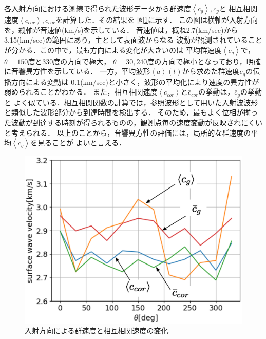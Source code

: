 各入射方向における測線で得られた波形データから群速度$\left<c_g\right>,\bar c_g$と
相互相関速度$\left<c_{cor}\right>, \bar c_{cor}$を計算した．その結果を
図\ref{fig:fig12}に示す．
この図は横軸が入射方向を，縦軸が音速値(km/s)を示している．
音速値は，概ね2.7(km/sec)から3.15(km/sec)の範囲にあり，主として表面波からなる
波動が観測されていることが分かる．この中で，最も方向による変化が大きいのは
平均群速度$\left<c_g\right>$で，$\theta=150$度と330度の方向で極大，
$\theta=30,240$度の方向で極小となっており，明確に音響異方性を示している．
一方，平均波形$\left<a \right>(t)$から求めた群速度$\bar c_g$の伝播方向による変動は
0.1(km/sec)と小さく，波形の平均化により速度の異方性が弱められることがわかる．
また，相互相関速度$\left<c_{cor}\right>$と$\bar{c}_{cor}$の挙動は，$\bar c_g$の挙動と
よく似ている．相互相関関数の計算では，参照波形として用いた入射波波形と類似した波形部分から到達時間を検出する．
そのため，最もよく位相が揃った波動が到達する時刻が得られるものの，観測点毎の速度変動が反映されにくいと考えられる．
以上のことから，音響異方性の評価には，局所的な群速度の平均$\left<c_g\right>$を見ることが
よいと言える．
\begin{figure}[h]
	\begin{center}
	\includegraphics[width=0.8\linewidth]{Figs/fig12.eps} 
	\end{center}
	\caption{
		入射方向による群速度と相互相関速度の変化.
	} 
	\label{fig:fig12}
\end{figure}

